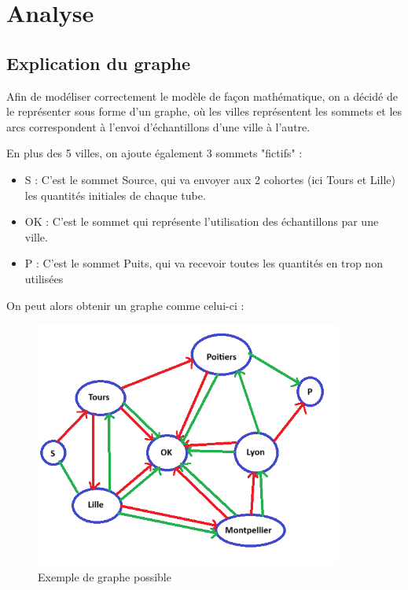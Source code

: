\documentclass{polytech/polytech}
\numberwithin{figure}{chapter}
\begin{document}
\section{Analyse}

\subsection{Explication du graphe}
Afin de modéliser correctement le modèle de façon mathématique, on a décidé de le représenter sous forme d'un graphe, où les villes représentent les sommets et les arcs correspondent à l'envoi d'échantillons d'une ville à l'autre.

En plus des 5 villes, on ajoute également 3 sommets "fictifs" : 
\begin{itemize}
	\item S : C'est le sommet Source, qui va envoyer aux 2 cohortes (ici Tours et Lille) les quantités initiales de chaque tube.
	\item OK : C'est le sommet qui représente l'utilisation des échantillons par une ville.
	\item P : C'est le sommet Puits, qui va recevoir toutes les quantités en trop non utilisées\\
\end{itemize}

On peut alors obtenir un graphe comme celui-ci : \\

\begin{figure}[ht]
    \centering
    \includegraphics[width=0.9\textwidth]{pic/graph.png}
    \caption{Exemple de graphe possible}
    \label{Exemple de graphe possible}
\end{figure}
\end{document}
